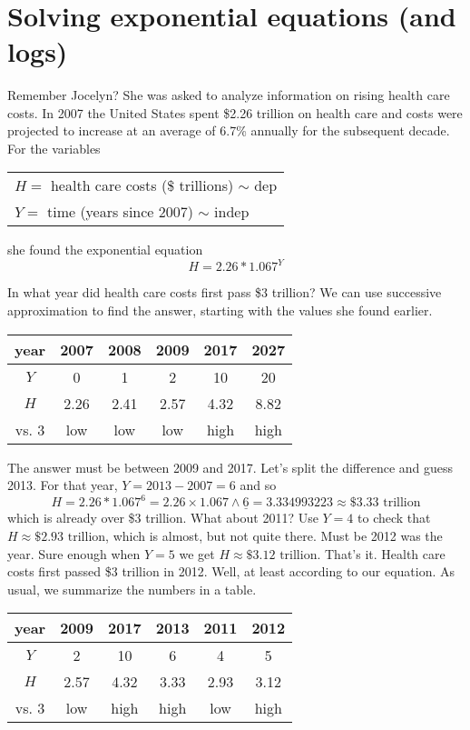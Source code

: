 ~\vspace{.1in}

\section{Solving exponential equations (and logs)}

Remember Jocelyn?  She was asked to analyze information on rising health care costs.  In 2007 the United States spent \$2.26 trillion on health care and costs were projected to increase at an average of 6.7\% annually for the subsequent decade.  For the variables
\begin{center}
\begin{tabular} {l} 
$H=$ health care costs (\$ trillions) $\sim$ dep \\
$Y= $ time (years since 2007) $\sim$ indep \\ 
\end{tabular}
\end{center}she found the exponential equation $$H = 2.26\ast 1.067^{Y}$$

In what year did health care costs first pass \$3 trillion?  We can use successive approximation to find the answer, starting with the values she found earlier. 
\begin{center}
\begin{tabular} {|c| |c |c |c |c |c|}\hline
year & 2007 & 2008 & 2009 & 2017 & 2027 \\ \hline
$Y$ & 0 & 1 & 2 & 10 & 20 \\ \hline
$H$ & 2.26 & 2.41 & 2.57 & 4.32 & 8.82 \\ \hline
vs. 3 & low & low & low & high & high \\ \hline
\end{tabular}
\end{center}
The answer must be between 2009 and 2017.  Let's split the difference and guess 2013.  For that year, $Y = 2013-2007 = 6$ and so 
$$H = 2.26 \ast 1.067^6 = 2.26 \times 1.067 \wedge \underline{6} = 3.334993223 \approx \$3.33 \text{ trillion}$$ 
which is already over \$3 trillion.  What about 2011?  Use $Y=4$ to check that $H  \approx \$2.93 \text{ trillion}$, which is
almost, but not quite there.  Must be 2012 was the year.  Sure enough when $Y=5$ we get $H \approx \$3.12 \text{ trillion}$. That's it.  Health care costs first passed \$3 trillion in 2012.  Well, at least according to our equation.  As usual, we summarize the numbers in a table.
\begin{center}
\begin{tabular} {|c| |c |c |c |c |c|}\hline
year &  2009 & 2017 & 2013 & 2011 & 2012 \\ \hline
$Y$ & 2 & 10 & 6 & 4 & 5 \\ \hline
$H$ & 2.57 &4.32 & 3.33 & 2.93 &  3.12 \\ \hline
vs. 3 & low & high & high & low & high \\ \hline
\end{tabular}
\end{center}

